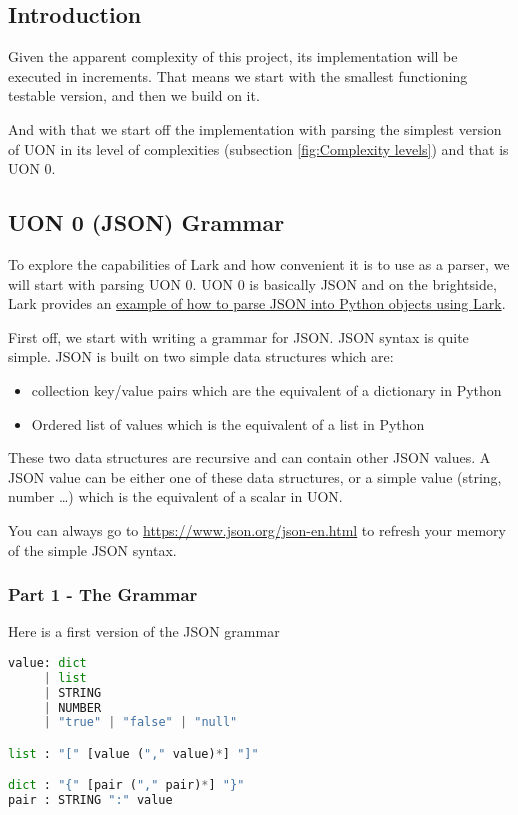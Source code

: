 \documentclass[12pt]{article}
\begin{document}
\pagebreak
\subsection{Introduction}
Given the apparent complexity of this project, its implementation will be executed in increments. That means we start with the smallest functioning testable version, and then we build on it.

And with that we start off the implementation with parsing the simplest version of UON in its level of complexities (subsection \ref{fig:Complexity levels}) and that is UON 0.

\subsection{UON 0 (JSON) Grammar}\label{grammar:json}
To explore the capabilities of Lark and how convenient it is to use as a parser, we will start with parsing UON 0. UON 0 is basically JSON and on the brightside, Lark provides an \href{https://github.com/lark-parser/lark/blob/master/docs/json_tutorial.md}{example of how to parse JSON into Python objects using Lark}. 

First off, we start with writing a grammar for JSON. JSON syntax is quite simple. JSON is built on two simple data structures which are:
\begin{itemize}
    \item collection key/value pairs which are the equivalent of a dictionary in Python
    \item Ordered list of values which is the equivalent of a list in Python
\end{itemize}
These two data structures are recursive and can contain other JSON values.
A JSON value can be either one of these data structures, or a simple value (string, number …) which is the equivalent of a scalar in UON.

You can always go to \url{https://www.json.org/json-en.html} to refresh your memory of the simple JSON syntax.

\subsubsection{Part 1 - The Grammar}
Here is a first version of the JSON grammar

\begin{lstlisting}[language=Python]
value: dict
     | list
     | STRING
     | NUMBER
     | "true" | "false" | "null"

list : "[" [value ("," value)*] "]"

dict : "{" [pair ("," pair)*] "}"
pair : STRING ":" value
\end{lstlisting}
\end{document}
